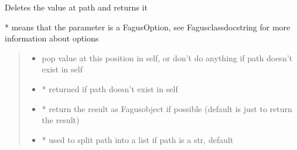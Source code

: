 \documentclass[a4paper,10pt,english]{sphinxmanual}
\begin{document}
\begin{fulllineitems}
\begin{fulllineitems}
\begin{quote}
\begin{description}
\begin{itemize}
\end{itemize}

\end{description}\end{quote}

\end{fulllineitems}


\begin{fulllineitems}
\label{\detokenize{fagus.fagus:fagus.fagus.Fagus.pop}}
\pysigstartsignatures
{}
\pysigstopsignatures
\sphinxAtStartPar
Deletes the value at path and returns it

\sphinxAtStartPar
* means that the parameter is a FagusOption, see Fagus\sphinxhyphen{}class\sphinxhyphen{}docstring for more information about options
\begin{quote}\begin{description}
\begin{itemize}
\item {}
\sphinxAtStartPar
{} \textendash{} pop value at this position in self, or don’t do anything if path doesn’t exist in self

\item {}
\sphinxAtStartPar
{} \textendash{} * returned if path doesn’t exist in self

\item {}
\sphinxAtStartPar
{} \textendash{} * return the result as Fagus\sphinxhyphen{}object if possible (default is just to return the result)

\item {}
\sphinxAtStartPar
{} \textendash{} * used to split path into a list if path is a str, default 


\end{itemize}
\end{description}
\end{quote}
\end{fulllineitems}
\end{fulllineitems}
\end{document}
